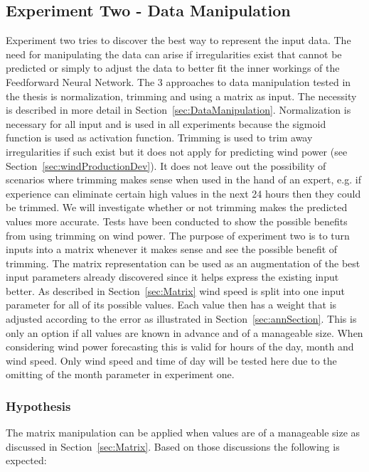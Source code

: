 \subsection{Experiment Two - Data Manipulation}
\label{sec:windProdExperimentTwo}
Experiment two tries to discover the best way to represent the input data. The need for manipulating the data can arise if irregularities exist that cannot be predicted or simply to adjust the data to better fit the inner workings of the Feedforward Neural Network. The 3 approaches to data manipulation tested in the thesis is normalization, trimming and using a matrix as input. The necessity is described in more detail in Section~\ref{sec:DataManipulation}. Normalization is necessary for all input and is used in all experiments because the sigmoid function is used as activation function. Trimming is used to trim away irregularities if such exist but it does not apply for predicting wind power (see Section~\ref{sec:windProductionDev}). It does not leave out the possibility of scenarios where trimming makes sense when used in the hand of an expert, e.g. if experience can eliminate certain high values in the next 24 hours then they could be trimmed. We will investigate whether or not trimming makes the predicted values more accurate. Tests have been conducted to show the possible benefits from using trimming on wind power. The purpose of experiment two is to turn inputs into a matrix whenever it makes sense and see the possible benefit of trimming. The matrix representation can be used as an augmentation of the best input parameters already discovered since it helps express the existing input better. As described in Section~\ref{sec:Matrix} wind speed is split into one input parameter for all of its possible values. Each value then has a weight that is adjusted according to the error as illustrated in Section~\ref{sec:annSection}. This is only an option if all values are known in advance and of a manageable size. When considering wind power forecasting this is valid for hours of the day, month and wind speed. Only wind speed and time of day will be tested here due to the omitting of the month parameter in experiment one. 

\subsubsection{Hypothesis} 
The matrix manipulation can be applied when values are of a manageable size as discussed in Section~\ref{sec:Matrix}. Based on those discussions the following is expected: 

